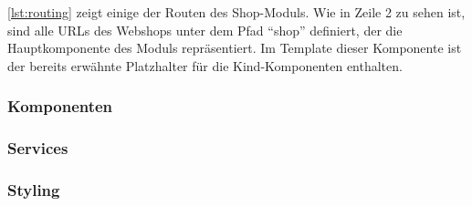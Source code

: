 \cref{lst:routing} zeigt einige der Routen des Shop-Moduls. Wie in Zeile 2 zu sehen ist, sind alle URLs des Webshops unter dem Pfad \enquote{shop} definiert, der die Hauptkomponente des Moduls repräsentiert. Im Template dieser Komponente ist der bereits erwähnte Platzhalter für die Kind-Komponenten enthalten.

\subsubsection{Komponenten}

\subsubsection{Services}

\subsubsection{Styling}



